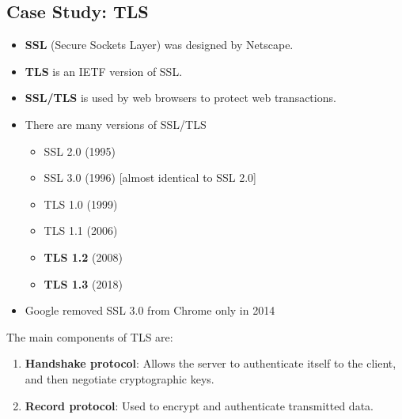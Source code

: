 \documentclass[12pt,titlepage]{article}
\begin{document}
\subsection{Case Study: TLS}
\begin{itemize}
	\item \textbf{SSL} (Secure Sockets Layer) was designed by Netscape.
	\item \textbf{TLS} is an IETF version of SSL.
	\item \textbf{SSL/TLS} is used by web browsers to protect web transactions.
	\item There are many versions of SSL/TLS\begin{itemize}
		\item SSL 2.0 (1995)
		\item SSL 3.0 (1996) [almost identical to SSL 2.0]
		\item TLS 1.0 (1999)
		\item TLS 1.1 (2006)
		\item \textbf{TLS 1.2} (2008)
		\item \textbf{TLS 1.3} (2018)
	\end{itemize}
	\item Google removed SSL 3.0 from Chrome only in 2014
\end{itemize}
The main components of TLS are:\begin{enumerate}
	\item \textbf{Handshake protocol}: Allows the server to authenticate itself to the client, and then negotiate cryptographic keys.
	\item \textbf{Record protocol}: Used to encrypt and authenticate transmitted data.
\end{enumerate}
\end{document}
